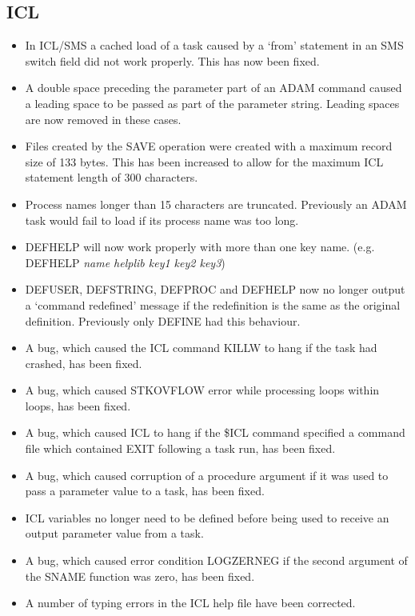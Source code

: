 \subsection{ICL}
\begin{itemize}
\item In ICL/SMS a cached load of a task caused by a `from' 
   statement in an SMS switch field did not work properly. 
   This has now been fixed.
\item A double space preceding the parameter part of an ADAM 
   command caused a leading space to be passed as part of the 
   parameter string. Leading spaces are now removed in these 
   cases.
\item Files created by the SAVE operation were created with a 
   maximum record size of 133 bytes. This has been increased 
   to allow for the maximum ICL statement length of 300 
   characters.
\item Process names longer than 15 characters are truncated. 
   Previously an ADAM task would fail to load if its process 
   name was too long.
\item DEFHELP will now work properly with more than one key name.
   (e.g. DEFHELP {\em name helplib key1 key2 key3}\/)
\item DEFUSER, DEFSTRING, DEFPROC and DEFHELP now no longer output
   a `command redefined' message if the redefinition is the same 
   as the original definition. Previously only DEFINE had this 
   behaviour.
\item A bug, which caused the ICL command KILLW to hang if the task had
  crashed, has been fixed.
\item A bug, which caused STKOVFLOW error while processing loops within
  loops, has been fixed.
\item A bug, which caused ICL to hang if the \$ICL command specified
  a command file which contained EXIT following a task run, has been fixed.
\item A bug, which caused corruption of a procedure argument if it was used
  to pass a parameter value to a task, has been fixed.
\item ICL variables no longer need to be defined before being used to receive
  an output parameter value from a task.
\item A bug, which caused error condition LOGZERNEG if the second argument
  of the SNAME function was zero, has been fixed.
\item A number of typing errors in the ICL help file have been corrected.
\end{itemize}

